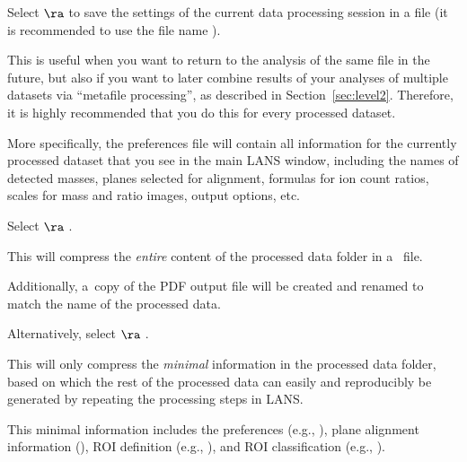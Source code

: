 \s Select  $\ra$  to save the settings of the current data processing session in a file (it is recommended to use the file name ). 

\nb
\bul This is useful when you want to return to the analysis of the same file in the future, but also if you want to later combine results of your analyses of multiple datasets via ``metafile processing'', as described in Section~\ref{sec:level2}. Therefore, it is highly recommended that you do this for every processed dataset.

\bul More specifically, the preferences file will contain all information for the currently processed dataset that you see in the main LANS window, including the names of detected masses, planes selected for alignment, formulas for ion count ratios, scales for mass and ratio images, output options, etc.

\s Select  $\ra$ .

\nb
\bul This will compress the \emph{entire} content of the processed data folder in a~ file.

\bul Additionally, a~copy of the PDF output file will be created and renamed to match the name of the processed data.

\s Alternatively, select  $\ra$ .

\nb
\bul This will only compress the \emph{minimal} information in the processed data folder, based on which the rest of the processed data can easily and reproducibly be generated by repeating the processing steps in LANS. 

\bul This minimal information includes the preferences (e.g., ), plane alignment information (), ROI definition (e.g., ), and ROI classification (e.g., ).
